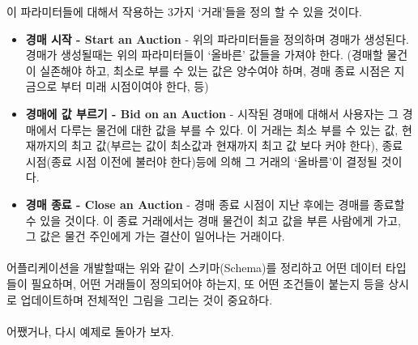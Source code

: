 \documentclass[a4paper, 11pt]{article}
\begin{document}
    이 파라미터들에 대해서 작용하는 3가지 `거래'들을 정의 할 수 있을 것이다.
    \begin{itemize}
        \item \textbf{경매 시작 - Start an Auction} - 위의 파라미터들을 정의하며 경매가 생성된다. 경매가 생성될때는 위의 파라미터들이 `올바른' 값들을 가져야 한다. (경매할 물건이 실존해야 하고, 최소로 부를 수 있는 값은 양수여야 하며, 경매 종료 시점은 지금으로 부터 미래 시점이여야 한다, 등)
        \item \textbf{경매에 값 부르기 - Bid on an Auction} - 시작된 경매에 대해서 사용자는 그 경매에서 다루는 물건에 대한 값을 부를 수 있다. 이 거래는 최소 부를 수 있는 값, 현재까지의 최고 값(부르는 값이 최소값과 현재까지 최고 값 보다 커야 한다), 종료 시점(종료 시점 이전에 불러야 한다)등에 의해 그 거래의 `올바름'이 결정될 것이다. 
        \item \textbf{경매 종료 - Close an Auction} - 경매 종료 시점이 지난 후에는 경매를 종료할 수 있을 것이다. 이 종료 거래에서는 경매 물건이 최고 값을 부른 사람에게 가고, 그 값은 물건 주인에게 가는 결산이 일어나는 거래이다.
    \end{itemize}
    
    \paragraph{} 어플리케이션을 개발할때는 위와 같이 스키마(Schema)를 정리하고 어떤 데이터 타입들이 필요하며, 어떤 거래들이 정의되어야 하는지, 또 어떤 조건들이 붙는지 등을 상시로 업데이트하며 전체적인 그림을 그리는 것이 중요하다.

    \paragraph{} 어쨌거나, 다시 예제로 돌아가 보자.
    
\end{document}
